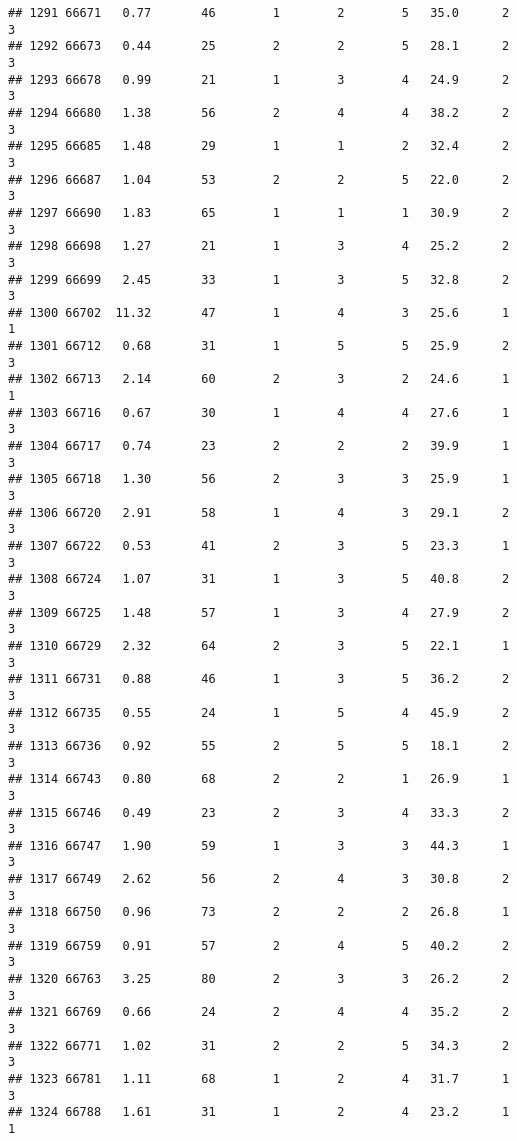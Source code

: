 \documentclass[
]{article}
\begin{document}
\begin{verbatim}
## 1291 66671   0.77       46        1        2        5   35.0      2      3
## 1292 66673   0.44       25        2        2        5   28.1      2      3
## 1293 66678   0.99       21        1        3        4   24.9      2      3
## 1294 66680   1.38       56        2        4        4   38.2      2      3
## 1295 66685   1.48       29        1        1        2   32.4      2      3
## 1296 66687   1.04       53        2        2        5   22.0      2      3
## 1297 66690   1.83       65        1        1        1   30.9      2      3
## 1298 66698   1.27       21        1        3        4   25.2      2      3
## 1299 66699   2.45       33        1        3        5   32.8      2      3
## 1300 66702  11.32       47        1        4        3   25.6      1      1
## 1301 66712   0.68       31        1        5        5   25.9      2      3
## 1302 66713   2.14       60        2        3        2   24.6      1      1
## 1303 66716   0.67       30        1        4        4   27.6      1      3
## 1304 66717   0.74       23        2        2        2   39.9      1      3
## 1305 66718   1.30       56        2        3        3   25.9      1      3
## 1306 66720   2.91       58        1        4        3   29.1      2      3
## 1307 66722   0.53       41        2        3        5   23.3      1      3
## 1308 66724   1.07       31        1        3        5   40.8      2      3
## 1309 66725   1.48       57        1        3        4   27.9      2      3
## 1310 66729   2.32       64        2        3        5   22.1      1      3
## 1311 66731   0.88       46        1        3        5   36.2      2      3
## 1312 66735   0.55       24        1        5        4   45.9      2      3
## 1313 66736   0.92       55        2        5        5   18.1      2      3
## 1314 66743   0.80       68        2        2        1   26.9      1      3
## 1315 66746   0.49       23        2        3        4   33.3      2      3
## 1316 66747   1.90       59        1        3        3   44.3      1      3
## 1317 66749   2.62       56        2        4        3   30.8      2      3
## 1318 66750   0.96       73        2        2        2   26.8      1      3
## 1319 66759   0.91       57        2        4        5   40.2      2      3
## 1320 66763   3.25       80        2        3        3   26.2      2      3
## 1321 66769   0.66       24        2        4        4   35.2      2      3
## 1322 66771   1.02       31        2        2        5   34.3      2      3
## 1323 66781   1.11       68        1        2        4   31.7      1      3
## 1324 66788   1.61       31        1        2        4   23.2      1      1

\end{verbatim}
\end{document}
